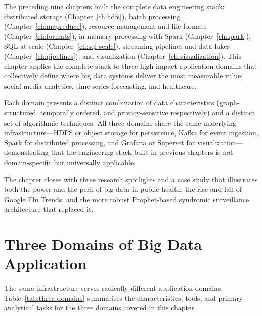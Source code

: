 \bigskip

The preceding nine chapters built the complete data engineering stack:
distributed storage (Chapter~\ref{ch:hdfs}), batch processing
(Chapter~\ref{ch:mapreduce}), resource management and file formats
(Chapter~\ref{ch:formats}), in-memory processing with Spark
(Chapter~\ref{ch:spark}), SQL at scale (Chapter~\ref{ch:sql-scale}),
streaming pipelines and data lakes (Chapter~\ref{ch:pipelines}),
and visualization (Chapter~\ref{ch:visualization}).
This chapter applies the complete stack to three high-impact application
domains that collectively define where big data systems deliver the most
measurable value: social media analytics, time series forecasting, and
healthcare.

Each domain presents a distinct combination of data characteristics
(graph-structured, temporally ordered, and privacy-sensitive respectively)
and a distinct set of algorithmic techniques. All three domains share the
same underlying infrastructure---HDFS or object storage for persistence,
Kafka for event ingestion, Spark for distributed processing, and Grafana
or Superset for visualization---demonstrating that the engineering stack
built in previous chapters is not domain-specific but universally applicable.

The chapter closes with three research spotlights and a case study
that illustrates both the power and the peril of big data in public
health: the rise and fall of Google Flu Trends, and the more robust
Prophet-based syndromic surveillance architecture that replaced it.

\section{Three Domains of Big Data Application}
\label{sec:domain-overview}

The same infrastructure serves radically different application domains.
Table~\ref{tab:three-domains} summarises the characteristics, tools,
and primary analytical tasks for the three domains covered in this chapter.

